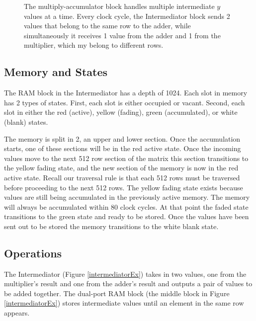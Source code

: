 \begin{figure}

\caption[The multiply-accumulator with an Intermediator.]{The multiply-accumulator block handles multiple intermediate $y$ values at a time. Every clock cycle, the Intermediator block sends 2 values that belong to the same row to the adder, while simultaneously it receives 1 value from the adder and 1 from the multiplier, which my belong to different rows.}
\label{fig:mac}
\end{figure}
\subsection{Memory and States}
The RAM block in the Intermediator has a depth of 1024. Each slot in memory has 2 types of states. First, each slot is either occupied or vacant. Second, each slot in either the red (active), yellow (fading), green (accumulated), or white (blank) states.

The memory is split in 2, an upper and lower section. Once the accumulation starts, one of these sections will be in the red active state. Once the incoming values move to the next 512 row section of the matrix this section transitions to the yellow fading state, and the new section of the memory is now in the red active state. Recall our traversal rule is that each 512 rows must be traversed before proceeding to the next 512 rows. The yellow fading state exists because values are still being accumulated in the previously active memory. The memory will always be accumulated within 80 clock cycles. At that point the faded state transitions to the green state and ready to be stored. Once the values have been sent out to be stored the memory transitions to the white blank state.

\subsection{Operations}
The Intermediator (Figure \ref{intermediatorEx}) takes in two values, one from the multiplier's result and one from the adder's result and outputs a pair of values to be added together. The dual-port RAM block (the middle block in Figure \ref{intermediatorEx}) stores intermediate values until an element in the same row appears. \par

